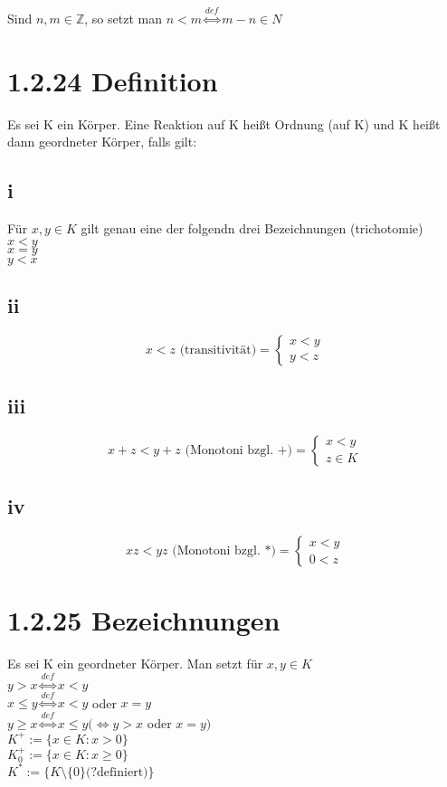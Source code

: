 \documentclass[11pt]{scrartcl}
\begin{document}
Sind $n,m \in \mathbb{Z}$, so setzt man $n < m \overset{def}{\iff} m - n \in N$ 

\section{1.2.24 Definition}
Es sei K ein Körper. Eine Reaktion auf K heißt Ordnung (auf K) und K heißt dann geordneter Körper, falls gilt:

\subsection*{i}
Für $x,y \in K$ gilt genau eine der folgendn drei Bezeichnungen (trichotomie) \\
 $x < y$\\
 $  x=y$\\
 $ y < x$\\
  
\subsection*{ii}



\[
x<z \text{ (transitivität)}=\left \{
\begin{array}{ll}
x < y\\
y < z
\end{array}
\right.
\]

\subsection*{iii}
\[
x+z<y+z \text{ (Monotoni bzgl. +)}=\left \{
\begin{array}{ll}
x < y\\
z \in K
\end{array}
\right.
\]
\subsection*{iv}
\[
xz < yz \text{ (Monotoni bzgl. *)}=\left \{
\begin{array}{ll}
x < y\\
0 < z
\end{array}
\right.
\]


\section{1.2.25 Bezeichnungen}
Es sei K ein geordneter Körper. Man setzt für $x,y \in K$ \\
$y > x \overset{def}{\iff} x < y$\\
$ x \leq y \overset{def}{\iff} x <y $ oder $x=y$ \\
$y \geq x \overset{def}{\iff}  x \leq y (\iff y > x $ oder $  x=y)$ \\
$K^{+} := \{x \in K : x > 0 \}$ \\
$K_{0}^{+} := \{x \in K : x \geq 0 \}$ \\
$K^{*} := \{ K \setminus \{0\} \text{(?definiert)} \}$ 
\end{document}
